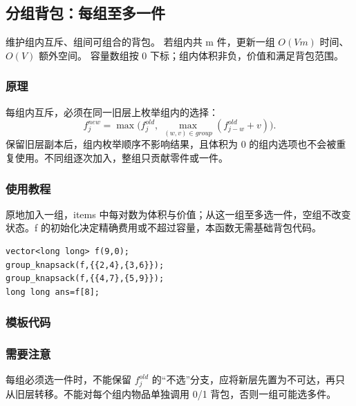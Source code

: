 \subsection{分组背包：每组至多一件}
\label{dp:group-knapsack}
\AlgorithmInfo
    {维护组内互斥、组间可组合的背包。}
    {若组内共 m 件，更新一组 $O(Vm)$ 时间、$O(V)$ 额外空间。}
    {容量数组按 0 下标；组内体积非负，价值和满足背包范围。}
\subsubsection*{原理}

每组内互斥，必须在同一旧层上枚举组内的选择：
\[
 f^{new}_j=\max\bigl(f^{old}_j,\ \max_{(w,v)\in group}(f^{old}_{j-w}+v)\bigr).
\]
保留旧层副本后，组内枚举顺序不影响结果，且体积为 0 的组内选项也不会被重复使用。不同组逐次加入，整组只贡献零件或一件。

\subsubsection*{使用教程}
 原地加入一组，items 中每对数为体积与价值；从这一组至多选一件，空组不改变状态。f 的初始化决定精确费用或不超过容量，本函数无需基础背包代码。
\begin{lstlisting}[style=mtycpp,numbers=none]
vector<long long> f(9,0);
group_knapsack(f,{{2,4},{3,6}});
group_knapsack(f,{{4,7},{5,9}});
long long ans=f[8];
\end{lstlisting}
\subsubsection*{模板代码}
\subsubsection*{需要注意}
每组必须选一件时，不能保留 $f^{old}_j$ 的“不选”分支，应将新层先置为不可达，再只从旧层转移。不能对每个组内物品单独调用 0/1 背包，否则一组可能选多件。
